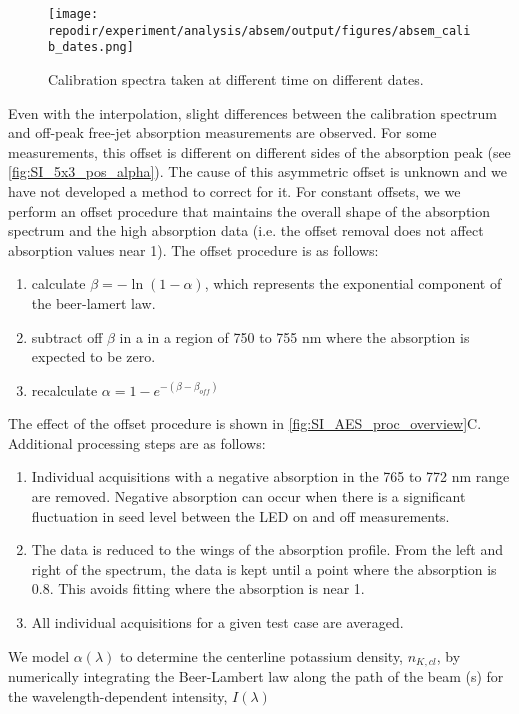 \begin{figure}[]
    \centering
    \texttt{[image: \\repodir/experiment/analysis/absem/output/figures/absem\_calib\_dates.png]}
    \caption{Calibration spectra taken at different time on different dates. }
    \label{fig:SI_absem_calib_dates}
\end{figure}

Even with the interpolation, slight differences between the calibration spectrum and off-peak free-jet absorption measurements are observed. For some measurements, this offset is different on different sides of the absorption peak (see \ref{fig:SI_5x3_pos_alpha}). The cause of this asymmetric offset is unknown and we have not developed a method to correct for it. For constant offsets, we we perform an offset procedure that maintains the overall shape of the absorption spectrum and the high absorption data (i.e. the offset removal does not affect absorption values near 1). The offset procedure is as follows:

\begin{enumerate}
    \item calculate $\beta = -\ln(1 - \alpha)$, which represents the exponential component of the beer-lamert law. 
    \item subtract off $\beta$ in a in a region of 750 to 755 nm where the absorption is expected to be zero.
    \item recalculate $\alpha = 1 - e^{- (\beta - \beta_{off})}$ 
\end{enumerate}

The effect of the offset procedure is shown in \ref{fig:SI_AES_proc_overview}C. Additional processing steps are as follows:

\begin{enumerate}
    \item Individual acquisitions with a negative absorption in the 765 to 772 nm range are removed. Negative absorption can occur when there is a significant fluctuation in seed level between the LED on and off measurements.
    \item The data is reduced to the wings of the absorption profile. From the left and right of the spectrum, the data is kept until a point where the absorption is 0.8. This avoids fitting where the absorption is near 1. 
    \item All individual acquisitions for a given test case are averaged.
\end{enumerate}

We model $\alpha(\lambda)$ to determine the centerline potassium density, $n_{K, cl}$, by numerically integrating the Beer-Lambert law along the path of the beam (s) for the wavelength-dependent intensity, $I(\lambda)$

